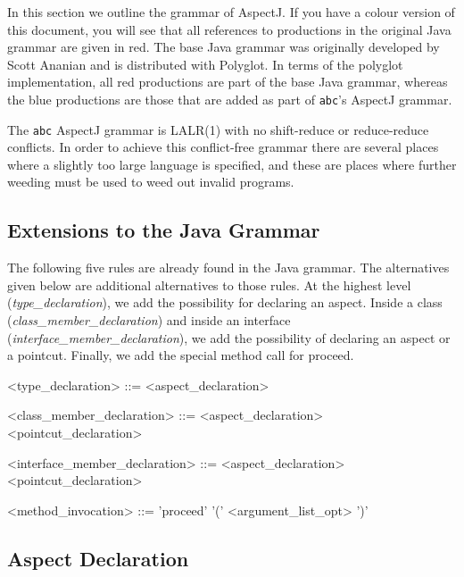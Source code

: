 In this section we outline the grammar of AspectJ.   If you have a colour
version of this document,  you will see that all references to
productions in the original Java grammar are given in red.   The base
Java  grammar was originally developed by Scott Ananian and is distributed
with Polyglot.   In terms of the
polyglot implementation, all red productions are part of the base Java 
grammar, whereas the blue productions are those that are added as part
of {\tt abc}'s AspectJ grammar.

The {\tt abc} AspectJ grammar is LALR(1) with no shift-reduce or 
reduce-reduce conflicts.
In order to achieve this conflict-free grammar there are several places
where a slightly too large language is specified, and these are places
where further weeding must be used to weed out invalid programs.

\subsection{Extensions to the Java Grammar}

The following five rules are already found in the Java grammar.  The
alternatives given below are additional alternatives to those rules.    At the
highest level ({\em type\_declaration}), we add the possibility for declaring
an aspect.    Inside a class ({\em class\_member\_declaration}) and inside an
interface ({\em interface\_member\_declaration}), we
add the possibility of declaring an aspect or a pointcut.   Finally, we add the
special method call for proceed. 

\begin{minipage}{6in}
\begin{grammar}
\begin{blue}
<{\red type_declaration}> ::= <aspect_declaration>

<{\red class_member_declaration}> ::= <aspect_declaration>
                            \alt      <pointcut_declaration>

<{\red interface_member_declaration}> ::= <aspect_declaration>
                                 \alt     <pointcut_declaration>

<{\red method_invocation}> ::= 'proceed' '(' {\red <argument_list_opt>} ')'

\end{blue}
\end{grammar}
\end{minipage}

\subsection{Aspect Declaration}

